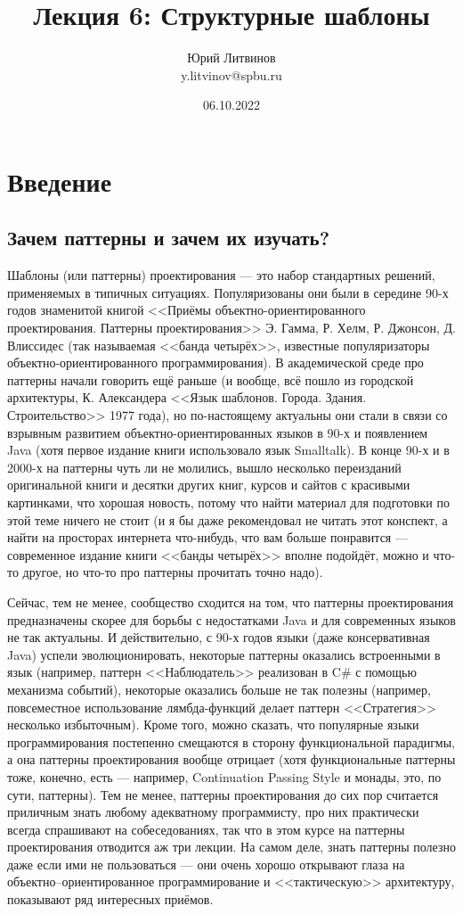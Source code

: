 \documentclass[a5paper]{article}
\title{Лекция 6: Структурные шаблоны}
\author{Юрий Литвинов\\\small{y.litvinov@spbu.ru}}
\date{06.10.2022}
\begin{document}
\maketitle
\thispagestyle{empty}

\section{Введение}

\subsection{Зачем паттерны и зачем их изучать?}

Шаблоны (или паттерны) проектирования --- это набор стандартных решений, применяемых в типичных ситуациях. Популяризованы они были в середине 90-х годов знаменитой книгой <<Приёмы объектно-ориентированного проектирования. Паттерны проектирования>> Э. Гамма, Р. Хелм, Р. Джонсон, Д. Влиссидес (так называемая <<банда четырёх>>, известные популяризаторы объектно-ориентированного программирования). В академической среде про паттерны начали говорить ещё раньше (и вообще, всё пошло из городской архитектуры, К. Александера <<Язык шаблонов. Города. Здания. Строительство>> 1977 года), но по-настоящему актуальны они стали в связи со взрывным развитием объектно-ориентированных языков в 90-х и появлением Java (хотя первое издание книги использовало язык Smalltalk). В конце 90-х и в 2000-х на паттерны чуть ли не молились, вышло несколько переизданий оригинальной книги и десятки других книг, курсов и сайтов с красивыми картинками, что хорошая новость, потому что найти материал для подготовки по этой теме ничего не стоит (и я бы даже рекомендовал не читать этот конспект, а найти на просторах интернета что-нибудь, что вам больше понравится --- современное издание книги <<банды четырёх>> вполне подойдёт, можно и что-то другое, но что-то про паттерны прочитать точно надо). 

Сейчас, тем не менее, сообщество сходится на том, что паттерны проектирования предназначены скорее для борьбы с недостатками Java и для современных языков не так актуальны. И действительно, с 90-х годов языки (даже консервативная Java) успели эволюционировать, некоторые паттерны оказались встроенными в язык (например, паттерн <<Наблюдатель>> реализован в C\# с помощью механизма событий), некоторые оказались больше не так полезны (например, повсеместное использование лямбда-функций делает паттерн <<Стратегия>> несколько избыточным). Кроме того, можно сказать, что популярные языки программирования постепенно смещаются в сторону функциональной парадигмы, а она паттерны проектирования вообще отрицает (хотя функциональные паттерны тоже, конечно, есть --- например, Continuation Passing Style и монады, это, по сути, паттерны). Тем не менее, паттерны проектирования до сих пор считается приличным знать любому адекватному программисту, про них практически всегда спрашивают на собеседованиях, так что в этом курсе на паттерны проектирования отводится аж три лекции. На самом деле, знать паттерны полезно даже если ими не пользоваться --- они очень хорошо открывают глаза на объектно--ориентированное программирование и <<тактическую>> архитектуру, показывают ряд интересных приёмов.
\end{document}
